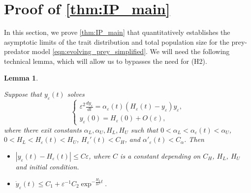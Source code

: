 \documentclass[]{article}
\newtheorem{lemma}{Lemma}
\theoremstyle{remark}
\begin{document}
\section{Proof of \cref{thm:IP_main}}
\label{sec: proof of 2nd thm}
In this section, we prove \cref{thm:IP_main} that quantitatively establishes the asymptotic limits of the trait distribution and total population size for the prey-predator model \eqref{eqn:evolving_prey_simplified}. We will need the following technical lemma, which will allow us to bypasses the need for (H2).

\begin{lemma}\label{lma:KPPBound}

Suppose that $y_\varepsilon(t)$ solves 
\begin{equation}\label{eqn:GenKPP}
    \begin{cases}
\varepsilon^2\frac{dy_\varepsilon}{dt}=\alpha_\varepsilon(t)(H_\varepsilon(t)-y_\varepsilon)y_\varepsilon,\\
y_\varepsilon(0)=H_\varepsilon(0)+O(\varepsilon),
\end{cases}
\end{equation}
where there exit constants $\alpha_L,\alpha_U,H_L,H_U$ such that $0<\alpha_L<\alpha_\varepsilon(t)<\alpha_U$, $0<H_L<H_\varepsilon(t)<H_U$, $H_\varepsilon'(t)<C_H$, and $\alpha'_\varepsilon(t)<C_\alpha$. Then 
\begin{itemize}
    \item[(a)] $|y_\varepsilon(t)-H_\varepsilon(t)|\leq{}C\varepsilon$, where $C$ is a constant depending on $C_H$, $H_L$, $H_U$ and initial condition.
    \item[(b)] $\dot{y}_\varepsilon(t)\leq{}C_1+\varepsilon^{-1}C_2\exp^{-\frac{H_L}{2\varepsilon^2}t}.$
\end{itemize}
\end{lemma}
\end{document}
